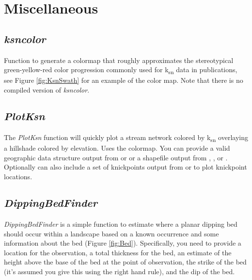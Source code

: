 \section{Miscellaneous}

\subsection{\textit{ksncolor}} \label{sec:ksncolor}
\paragraph{}Function to generate a colormap that roughly approximates the stereotypical green-yellow-red color progression commonly used for k\textsubscript{sn} data in publications, see Figure \ref{fig:KsnSwath} for an example of the color map. Note that there is no compiled version of \textit{ksncolor}.

\subsection{\textit{PlotKsn}} \label{sec:plotksn}
\paragraph{}The \textit{PlotKsn} function will quickly plot a stream network colored by k\textsubscript{sn} overlaying a hillshade colored by elevation. Uses the  colormap. You can provide a valid geographic data structure output from  or   or a shapefile output from , , or  . Optionally can also include a set of knickpoints output from  or  to plot knickpoint locations. 

\subsection{\textit{DippingBedFinder}} \label{sec:BedFinder}
\paragraph{}\textit{DippingBedFinder} is a simple function to estimate where a planar dipping bed should occur within a landscape based on a known occurrence and some information about the bed (Figure \ref{fig:Bed}). Specifically, you need to provide a location for the observation, a total thickness for the bed, an estimate of the height above the base of the bed at the point of observation, the strike of the bed (it's assumed you give this using the right hand rule), and the dip of the bed. 

